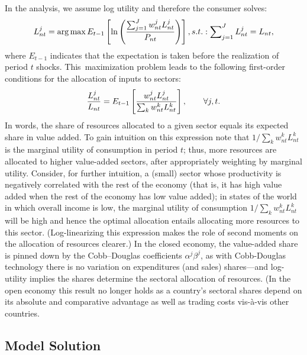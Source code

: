 \documentclass[12pt]{article}
\begin{document}
In the analysis, we assume log utility and therefore the consumer solves: 
\begin{equation}
L_{nt}^{j}=\arg \max E_{t-1}\left[ \ln \left( \frac{%
\sum_{j=1}^{J}w_{nt}^{j}L_{nt}^{j}}{P_{nt}}\right) \right]
,s.t.:\sum\nolimits_{j=1}^{J}L_{nt}^{j}=L_{nt},  \label{eq:log:utility}
\end{equation}%
where $E_{t-1}$ indicates that the expectation is taken before the
realization of period $t$ shocks. This\ maximization problem leads to the
following first-order conditions for the allocation of inputs to sectors: 
\begin{equation}
\frac{L_{nt}^{j}}{L_{nt}}=E_{t-1}\left[ \frac{w_{nt}^{j}L_{nt}^{j}}{%
\sum_{k}w_{nt}^{k}L_{nt}^{k}}\right] ,\qquad \forall j,t.  \label{eq:FOC}
\end{equation}%
In words, the share of resources allocated to a given sector equals its
expected share in value added. To gain intuition on this expression note
that $1/\sum_{k}w_{nt}^{k}L_{nt}^{k}$ is the marginal utility of consumption
in period $t$; thus, more resources are allocated to higher value-added
sectors, after appropriately weighting by marginal utility. Consider, for
further intuition, a (small) sector whose productivity is negatively
correlated with the rest of the economy (that is, it has high value added
when the rest of the economy has low value added); in states of the world in
which overall income is low, the marginal utility of consumption $%
1/\sum_{k}w_{nt}^{k}L_{nt}^{k}$ will be high and hence the optimal
allocation entails allocating more resources to this sector.
(Log-linearizing this expression makes the role of second moments on the
allocation of resources clearer.) In the closed economy, the value-added
share is pinned down by the Cobb--Douglas coefficients $\alpha ^{j}\beta
^{j} $, as with Cobb-Douglas technology there is no variation on
expenditures (and sales) shares---and log-utility implies the shares
determine the sectoral allocation of resources. (In the open economy this
result no longer holds as a country's sectoral shares depend on its absolute
and comparative advantage as well as trading costs vis-\`{a}-vis other
countries.

\subsection{Model Solution}
\end{document}
